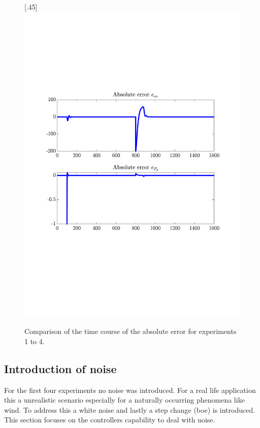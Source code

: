 \begin{figure}[H]
[.45\textwidth]{\includegraphics[width=1\linewidth, scale=1, trim=60 230 55 150,clip]{fig/Open_loop/exp_4_error.pdf}}

    \caption{Comparison of the time course of the absolute error for experiments 1 to 4.}
    \label{fig:condes:results:controller_outside_domain}
\end{figure}


\subsection{Introduction of noise}

For the first four experiments no noise was introduced.
For a real life application this a unrealistic scenario especially for a naturally occurring phenomena like wind.
To address this a white noise and lastly a step change (boe) is introduced.
This section focuses on the controllers capability to deal with noise.

